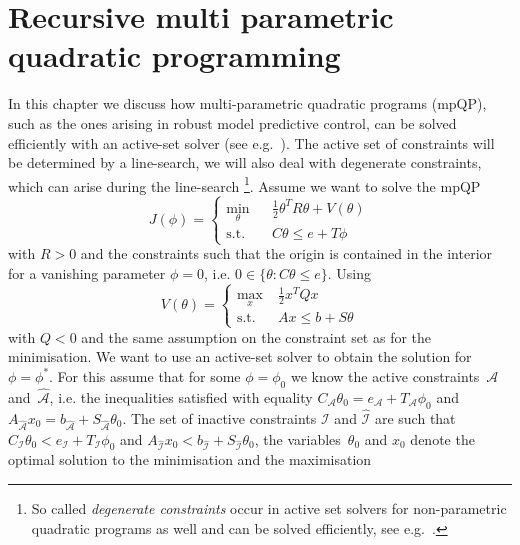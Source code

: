 
\chapter{Recursive multi parametric quadratic programming}\label{app:chp:mpqp}

In this chapter we discuss how multi-parametric quadratic programs (mpQP), such as the ones arising in
robust model predictive control, can be solved efficiently with an active-set solver (see 
e.g.~\cite{Fletcher:1987}).
%
The active set of constraints will be determined by a line-search, we will also deal with degenerate
constraints, which can arise during the line-search
%
\footnote{So called \emph{degenerate constraints} occur in active set solvers for non-parametric quadratic programs 
as well and can be solved efficiently, see e.g.~\cite{fletcher:1993}.
}.
%
Assume we want to solve the mpQP
%
\begin{equation}
	J(\phi) = \left\{\begin{array}{rcl}
	\min_\theta& &\frac{1}{2} \theta^T R \theta  + V(\theta) \\
	\text{s.t.}& &C\theta\leq e+ T\phi
	\end{array}\right.
\end{equation}
%
with $R>0$ and the constraints such that the origin is contained in the interior for a vanishing parameter
$\phi=0$, i.e. $0\in\{\theta:C\theta\leq e\}$.
%
Using
%
\begin{equation}
	V(\theta) = \left\{\begin{split}
		\max_x & \;\frac{1}{2} x^T Q x\\
		\text{s.t.} &\; Ax  \leq b +S\theta
	\end{split}\right.
\end{equation}
%
with $Q<0$ and the same assumption on the constraint set as for the minimisation.
%
We want to use an active-set solver to obtain the solution for $\phi=\phi^\ast$.
%
For this assume that for some $\phi=\phi_0$ we know the active constraints~$\mathcal A$ and~$\hat{\mathcal A}$,
i.e. the inequalities satisfied with equality $C_{\mathcal A}\theta_0=e_{\mathcal A} + T_{\mathcal A}\phi_0$
and $A_{\hat{\mathcal A}}x_0=b_{\hat{\mathcal A}}+S_{\hat{\mathcal A}}\theta_0$.
%
The set of inactive constraints $\mathcal I$ and $\hat{\mathcal I}$ are such that $C_{\mathcal I}\theta_0<
e_{\mathcal I} + T_{\mathcal I}\phi_0$ and $A_{\hat{\mathcal I}}x_0<b_{\hat{\mathcal I}}+S_{\hat{\mathcal I}}
\theta_0$, the variables~$\theta_0$ and $x_0$ denote the optimal solution to the minimisation and the maximisation
